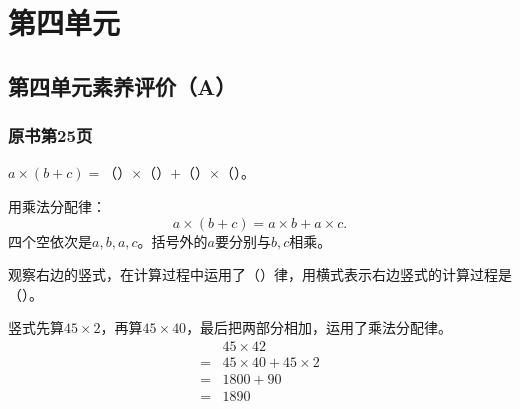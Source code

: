 \chapter{第四单元}


\section{第四单元素养评价（A）}



\subsection*{原书第25页}

\(a\times(b+c)=\)（\hspace{1.8em}）\(\times\)（\hspace{1.8em}）\(+\)（\hspace{1.8em}）\(\times\)（\hspace{1.8em}）。\par
\begin{BookAnswer}
用乘法分配律：\[a\times(b+c)=a\times b+a\times c.\]四个空依次是\(a,b,a,c\)。括号外的\(a\)要分别与\(b,c\)相乘。
\end{BookAnswer}

观察右边的竖式，在计算过程中运用了（\hspace{1.8em}）律，用横式表示右边竖式的计算过程是（\hspace{1.8em}）。\par
{}
\begin{BookAnswer}
竖式先算\(45\times2\)，再算\(45\times40\)，最后把两部分相加，运用了乘法分配律。\[\begin{aligned} &45\times42\\={}&45\times40+45\times2\\={}&1800+90\\={}&1890\end{aligned}\]
\end{BookAnswer}

